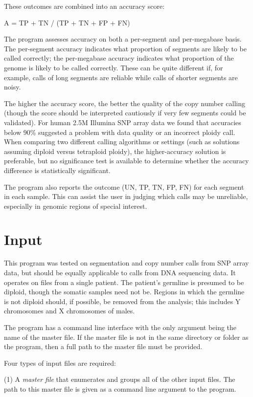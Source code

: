 \documentclass{article}
\begin{document}
These outcomes are combined into an accuracy score:  

A = TP + TN / (TP + TN + FP + FN)

The program assesses accuracy on both a per-segment and per-megabase
basis.  The per-segment accuracy indicates what proportion of
segments are likely to be called correctly; the per-megabase
accuracy indicates what proportion of the genome is likely to be
called correctly.  These can be quite different if, for example,
calls of long segments are reliable while calls of shorter
segments are noisy.

The higher the accuracy score, the better the quality of the copy
number calling (though the score should be interpreted cautiously if
very few segments could be validated).  For human 2.5M Illumina SNP array
data we found that accuracies below 90\% suggested a problem with
data quality or an incorrect ploidy call.  When comparing two 
different calling algorithms or settings (such as solutions assuming
diploid versus tetraploid ploidy), the higher-accuracy solution is
preferable, but no significance test is available to determine whether
the accuracy difference is statistically significant.

The program also reports the outcome (UN, TP, TN, FP, FN) for each segment
in each sample.  This can assist the user in judging which calls may be
unreliable, especially in genomic regions of special interest.

\section*{Input}

This program was tested on segmentation and copy number calls from
SNP array data, but should be equally applicable to calls from
DNA sequencing data.  It operates on files from a single patient.
The patient's germline is presumed to be diploid, though the somatic
samples need not be.  Regions in which the germline is not diploid
should, if possible, be removed from the analysis; this
includes Y chromosomes and X chromosomes of males.

The program has a command line interface with the only argument being
the name of the master file.  If the master file is not in the same
directory or folder as the program, then a full path to the master file
must be provided.

Four types of input files are required:

(1)  A {\it master file} that enumerates and groups all of the other
input files.  The path to this master file is given as a command
line argument to the program.
\end{document}
